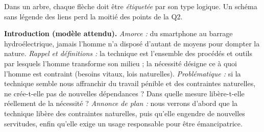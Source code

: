 \documentclass[11pt]{article}
\newcommand{\cle}[1]{{\popxbold\color{popdark}#1}}
\begin{document}
\begin{attention}
Dans un arbre, chaque flèche doit être \emph{étiquetée} par son type logique. Un schéma sans légende des liens perd la moitié des points de la Q2.
\end{attention}

\begin{corrige}
\textbf{Introduction (modèle attendu).} \emph{Amorce :} du smartphone au barrage hydroélectrique, jamais l'homme n'a disposé d'autant de moyens pour dompter la nature. \emph{Rappel et définitions :} la \cle{technique} est l'ensemble des procédés et outils par lesquels l'homme transforme son milieu ; la \cle{nécessité} désigne ce à quoi l'homme est contraint (besoins vitaux, lois naturelles). \emph{Problématique :} si la technique semble nous affranchir du travail pénible et des contraintes naturelles, ne crée-t-elle pas de nouvelles dépendances ? Dans quelle mesure libère-t-elle réellement de la nécessité ? \emph{Annonce de plan :} nous verrons d'abord que la technique libère des contraintes naturelles, puis qu'elle engendre de nouvelles servitudes, enfin qu'elle exige un usage responsable pour être émancipatrice.


\end{corrige}
\end{document}
